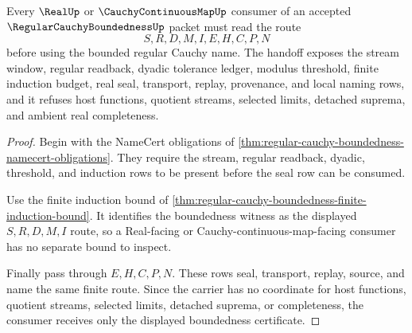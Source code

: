 \begin{theorem}
\label{thm:regular-cauchy-boundedness-real-handoff}
Every $\RealUp$ or $\CauchyContinuousMapUp$ consumer of an accepted $\RegularCauchyBoundednessUp$ packet must read the route
$$
S,R,D,M,I,E,H,C,P,N
$$
before using the bounded regular Cauchy name. The handoff exposes the stream window, regular readback, dyadic tolerance ledger, modulus threshold, finite induction budget, real seal, transport, replay, provenance, and local naming rows, and it refuses host functions, quotient streams, selected limits, detached suprema, and ambient real completeness.
\end{theorem}
\begin{proof}
Begin with the NameCert obligations of \autoref{thm:regular-cauchy-boundedness-namecert-obligations}. They require the stream, regular readback, dyadic, threshold, and induction rows to be present before the seal row can be consumed.

Use the finite induction bound of \autoref{thm:regular-cauchy-boundedness-finite-induction-bound}. It identifies the boundedness witness as the displayed $S,R,D,M,I$ route, so a Real-facing or Cauchy-continuous-map-facing consumer has no separate bound to inspect.

Finally pass through $E,H,C,P,N$. These rows seal, transport, replay, source, and name the same finite route. Since the carrier has no coordinate for host functions, quotient streams, selected limits, detached suprema, or completeness, the consumer receives only the displayed boundedness certificate.
\end{proof}


\begin{closurestatus}{\RegularCauchyBoundednessUp}
  \theoryclosure{\obligationClosure}
  \formalstatus{\unformalizedV}
\end{closurestatus}
